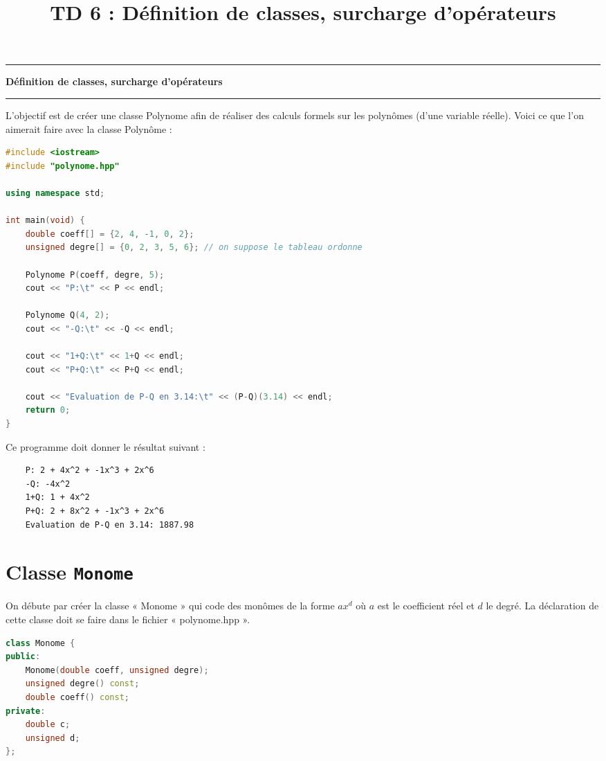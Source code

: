 \documentclass[a4paper,14pt]{article}
\title{TD 6 : Définition de classes, surcharge d'opérateurs}
\author{}
\date{}
\begin{document}
\hrule height 1pt
\vspace{0.1cm}
\noindent
{}
\begin{center}
{\Large \bf Définition de classes, surcharge d'opérateurs}
\end{center}
\hrule height 1pt
\vspace{0.5cm}


\noindent L'objectif est de créer une classe Polynome afin de réaliser des calculs formels sur les polynômes (d'une variable réelle).
Voici ce que l'on aimerait faire avec la classe Polynôme :

\begin{lstlisting}[language=C++]
#include <iostream>
#include "polynome.hpp"

using namespace std;

int main(void) {
    double coeff[] = {2, 4, -1, 0, 2};
    unsigned degre[] = {0, 2, 3, 5, 6}; // on suppose le tableau ordonne
    
    Polynome P(coeff, degre, 5);
    cout << "P:\t" << P << endl;

    Polynome Q(4, 2);
    cout << "-Q:\t" << -Q << endl;

    cout << "1+Q:\t" << 1+Q << endl;
    cout << "P+Q:\t" << P+Q << endl;

    cout << "Evaluation de P-Q en 3.14:\t" << (P-Q)(3.14) << endl;
    return 0;
}
\end{lstlisting}

\noindent Ce programme doit donner le résultat suivant :
\begin{verbatim}
    P: 2 + 4x^2 + -1x^3 + 2x^6
    -Q: -4x^2
    1+Q: 1 + 4x^2
    P+Q: 2 + 8x^2 + -1x^3 + 2x^6
    Evaluation de P-Q en 3.14: 1887.98
\end{verbatim}

\section*{Classe \texttt{Monome}}

On débute par créer la classe « Monome » qui code des monômes de la forme $ax^d$ où $a$ est le coefficient réel et $d$ le degré. La déclaration de cette classe doit se faire dans le fichier « polynome.hpp ».
\begin{lstlisting}[language=C++]
class Monome {
public:
    Monome(double coeff, unsigned degre);
    unsigned degre() const;
    double coeff() const;
private:
    double c;
    unsigned d;
};
\end{lstlisting}
\end{document}

